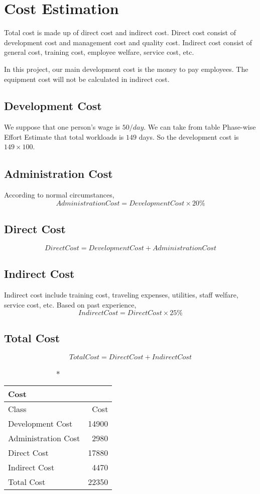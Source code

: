 \documentclass[a4paper,11pt]{article}
\begin{document}
\section{Cost Estimation}
Total cost is made up of direct cost and indirect cost.
Direct cost consist of development cost and management cost and quality cost.
Indirect cost consist of general cost, training cost, employee welfare, service cost, etc.

In this project, our main development cost is the money to pay employees.
The equipment cost will not be calculated in indirect cost.

\subsection{Development Cost}
We suppose that one person's wage is \(50/day\).
We can take from table Phase-wise Effort Estimate that total workloads is \(149\) days.
So the development cost is \(149 \times 100\).

\subsection{Administration Cost}
According to normal circumstances,
\[
Administration Cost = Development Cost \times 20\%
\]

\subsection{Direct Cost}
\[
Direct Cost = Development Cost + Administration Cost
\]

\subsection{Indirect Cost}
Indirect cost include training cost, traveling expenses, utilities, staff welfare, service cost, etc.
Based on past experience,
\[
Indirect Cost = Direct Cost \times 25\%
\]

\subsection{Total Cost}
\[
Total Cost = Direct Cost + Indirect Cost
\]

\begin{center}
\begin{longtable}{|l|r|}
\caption*{Cost} \\
\hline Class               & Cost \\
\hline Development Cost    & 14900 \\
\hline Administration Cost & 2980 \\
\hline Direct Cost         & 17880 \\
\hline Indirect Cost       & 4470 \\
\hline Total Cost          & 22350 \\
\hline 
\end{longtable}
\end{center}
\end{document}
